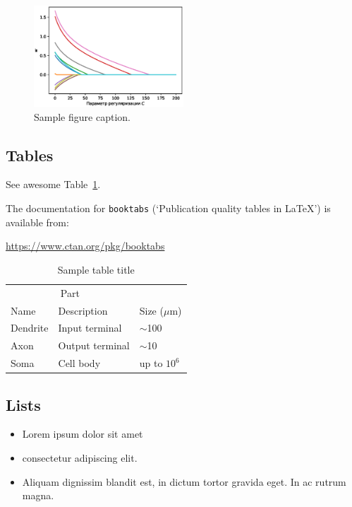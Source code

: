 \documentclass{article}
\begin{document}
\begin{figure}
	\centering
	\includegraphics[width=0.5\textwidth]{../figures/log_reg_cs_exp.eps}
	\caption{Sample figure caption.}
	\label{fig:fig1}
\end{figure}

\subsection{Tables}
See awesome Table~\ref{tab:table}.

The documentation for \verb+booktabs+ (`Publication quality tables in LaTeX') is available from:
\begin{center}
	\url{https://www.ctan.org/pkg/booktabs}
\end{center}


\begin{table}
	\caption{Sample table title}
	\centering
	\begin{tabular}{lll}
		\toprule
		\multicolumn{2}{c}{Part}                   \\
		\cmidrule(r){1-2}
		Name     & Description     & Size ($\mu$m) \\
		\midrule
		Dendrite & Input terminal  & $\sim$100     \\
		Axon     & Output terminal & $\sim$10      \\
		Soma     & Cell body       & up to $10^6$  \\
		\bottomrule
	\end{tabular}
	\label{tab:table}
\end{table}

\subsection{Lists}
\begin{itemize}
	\item Lorem ipsum dolor sit amet
	\item consectetur adipiscing elit.
	\item Aliquam dignissim blandit est, in dictum tortor gravida eget. In ac rutrum magna.
\end{itemize}




\end{document}
